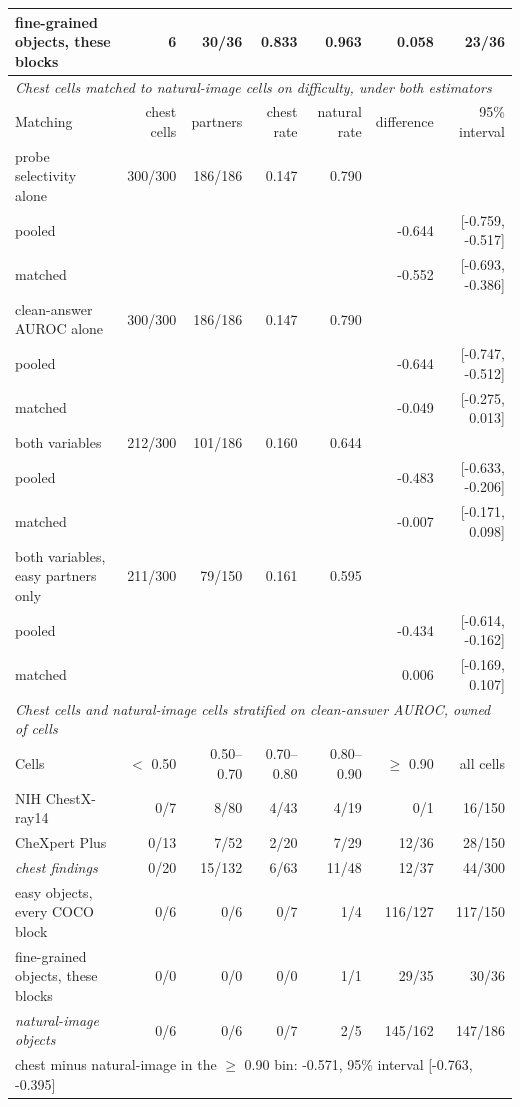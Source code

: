 \begin{table}[htbp]
{\begin{tabular}{lrrrrrr}
fine-grained objects, these blocks & 6 & 30/36 & 0.833 & 0.963 & 0.058 & 23/36 \\
\midrule
\multicolumn{7}{l}{\textit{Chest cells matched to natural-image cells on difficulty, under both estimators}} \\
Matching & chest cells & partners & chest rate & natural rate & difference & 95\% interval \\
\midrule
probe selectivity alone & 300/300 & 186/186 & 0.147 & 0.790 &  &  \\
\quad pooled &  &  &  &  & -0.644 & [-0.759, -0.517] \\
\quad matched &  &  &  &  & -0.552 & [-0.693, -0.386] \\
clean-answer AUROC alone & 300/300 & 186/186 & 0.147 & 0.790 &  &  \\
\quad pooled &  &  &  &  & -0.644 & [-0.747, -0.512] \\
\quad matched &  &  &  &  & -0.049 & [-0.275, 0.013] \\
both variables & 212/300 & 101/186 & 0.160 & 0.644 &  &  \\
\quad pooled &  &  &  &  & -0.483 & [-0.633, -0.206] \\
\quad matched &  &  &  &  & -0.007 & [-0.171, 0.098] \\
both variables, easy partners only & 211/300 & 79/150 & 0.161 & 0.595 &  &  \\
\quad pooled &  &  &  &  & -0.434 & [-0.614, -0.162] \\
\quad matched &  &  &  &  & 0.006 & [-0.169, 0.107] \\
\midrule
\multicolumn{7}{l}{\textit{Chest cells and natural-image cells stratified on clean-answer AUROC, owned of cells}} \\
Cells & $<$ 0.50 & 0.50--0.70 & 0.70--0.80 & 0.80--0.90 & $\geq$ 0.90 & all cells \\
\midrule
NIH ChestX-ray14 & 0/7 & 8/80 & 4/43 & 4/19 & 0/1 & 16/150 \\
CheXpert Plus & 0/13 & 7/52 & 2/20 & 7/29 & 12/36 & 28/150 \\
\textit{chest findings} & 0/20 & 15/132 & 6/63 & 11/48 & 12/37 & 44/300 \\
easy objects, every COCO block & 0/6 & 0/6 & 0/7 & 1/4 & 116/127 & 117/150 \\
fine-grained objects, these blocks & 0/0 & 0/0 & 0/0 & 1/1 & 29/35 & 30/36 \\
\textit{natural-image objects} & 0/6 & 0/6 & 0/7 & 2/5 & 145/162 & 147/186 \\
\multicolumn{7}{l}{\quad chest minus natural-image in the $\geq$ 0.90 bin: -0.571, 95\% interval [-0.763, -0.395]} \\
\bottomrule
\end{tabular}}
\end{table}
